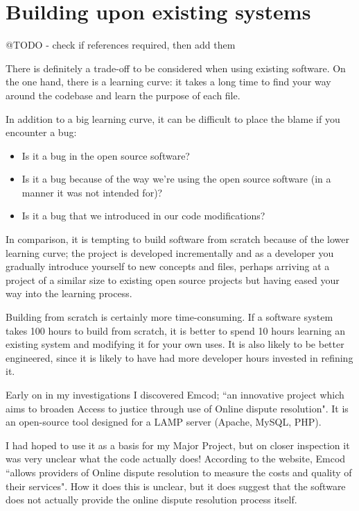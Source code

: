 \chapter{Building upon existing systems}\label{appendix:buildingUponExistingSystems}

@TODO - check if references required, then add them

There is definitely a trade-off to be considered when using existing software. On the one hand, there is a learning curve: it takes a long time to find your way around the codebase and learn the purpose of each file.

In addition to a big learning curve, it can be difficult to place the blame if you encounter a bug:

\begin{itemize}
\item Is it a bug in the open source software?
\item Is it a bug because of the way we're using the open source software (in a manner it was not intended for)?
\item Is it a bug that we introduced in our code modifications?
\end{itemize}

In comparison, it is tempting to build software from scratch because of the lower learning curve; the project is developed incrementally and as a developer you gradually introduce yourself to new concepts and files, perhaps arriving at a project of a similar size to existing open source projects but having eased your way into the learning process.

Building from scratch is certainly more time-consuming. If a software system takes 100 hours to build from scratch, it is better to spend 10 hours learning an existing system and modifying it for your own uses. It is also likely to be better engineered, since it is likely to have had more developer hours invested in refining it.

Early on in my investigations I discovered Emcod; ``an innovative project which aims to broaden Access to justice through use of Online dispute resolution". It is an open-source tool designed for a LAMP server (Apache, MySQL, PHP).

I had hoped to use it as a basis for my Major Project, but on closer inspection it was very unclear what the code actually does! According to the website, Emcod ``allows providers of Online dispute resolution to measure the costs and quality of their services". How it does this is unclear, but it does suggest that the software does not actually provide the online dispute resolution process itself.

